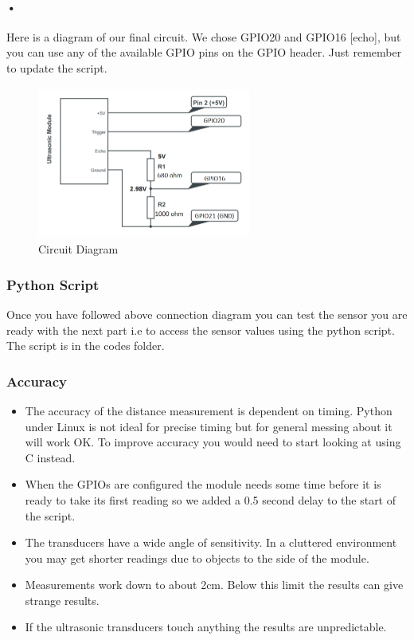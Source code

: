 \documentclass[a4paper,12pt,oneside]{book}
\begin{document}
\paragraph{•}
Here is a diagram of our final circuit. We chose GPIO20 and GPIO16 [echo], but you can use any of the available GPIO pins on the GPIO header. Just remember to update the script.
	\begin{figure}[H]
	 	\centering
		\includegraphics[width=7cm,height=5cm]{pin}
		\caption{Circuit Diagram}
	\end{figure}
	\subsubsection{Python Script}
		Once you have followed above connection diagram you can test the sensor you are ready with the next part i.e to access the sensor values using the python script. The script is in the codes folder.
	\subsubsection{Accuracy}
		\begin{itemize}
			\item The accuracy of the distance measurement is dependent on timing. Python under Linux is not ideal for precise timing but for general messing about it will work OK. To improve accuracy you would need to start looking at using C instead.
			\item When the GPIOs are configured the module needs some time before it is ready to take its first reading so we added a 0.5 second delay to the start of the script.
			\item The transducers have a wide angle of sensitivity. In a cluttered environment you may get shorter readings due to objects to the side of the module.
			\item Measurements work down to about 2cm. Below this limit the results can give strange results.
			\item If the ultrasonic transducers touch anything the results are unpredictable.
		\end{itemize}
\end{document}
